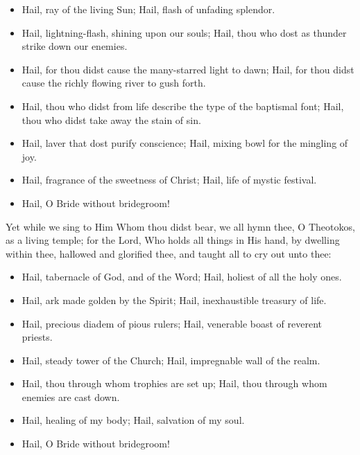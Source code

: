 \documentclass[twoside, letterpaper, 12pt]{report}
\begin{document}
\begin{itemize}[label=\tiny{+},leftmargin=*]
\item Hail, ray of the living Sun;
      Hail, flash of unfading splendor.
\item Hail, lightning-flash, shining upon our souls;
      Hail, thou who dost as thunder strike down our enemies.
\item Hail, for thou didst cause the many-starred light to dawn;
      Hail, for thou didst cause the richly flowing river to gush forth.
\item Hail, thou who didst from life describe the type of the baptismal font;
      Hail, thou who didst take away the stain of sin.
\item Hail, laver that dost purify conscience;
      Hail, mixing bowl for the mingling of joy.
\item Hail, fragrance of the sweetness of Christ;
      Hail, life of mystic festival. 
\item Hail, O Bride without bridegroom! 
\end{itemize}





\begin{priest}
  \item Yet while we sing to Him Whom thou didst bear,
  we all hymn thee, O Theotokos, as a living temple;
  for the Lord, Who holds all things in His hand, by dwelling within thee,
  hallowed and glorified thee, and taught all to cry out unto thee:
\end{priest}

\begin{itemize}[label=\tiny{+},leftmargin=*]
\item Hail, tabernacle of God, and of the Word;
      Hail, holiest of all the holy ones.
\item Hail, ark made golden by the Spirit;
      Hail, inexhaustible treasury of life.
\item Hail, precious diadem of pious rulers;
      Hail, venerable boast of reverent priests.
\item Hail, steady tower of the Church;
      Hail, impregnable wall of the realm.
\item Hail, thou through whom trophies are set up;
      Hail, thou through whom enemies are cast down.
\item Hail, healing of my body; Hail,
      salvation of my soul. 
\item Hail, O Bride without bridegroom! 
\end{itemize}
\end{document}
